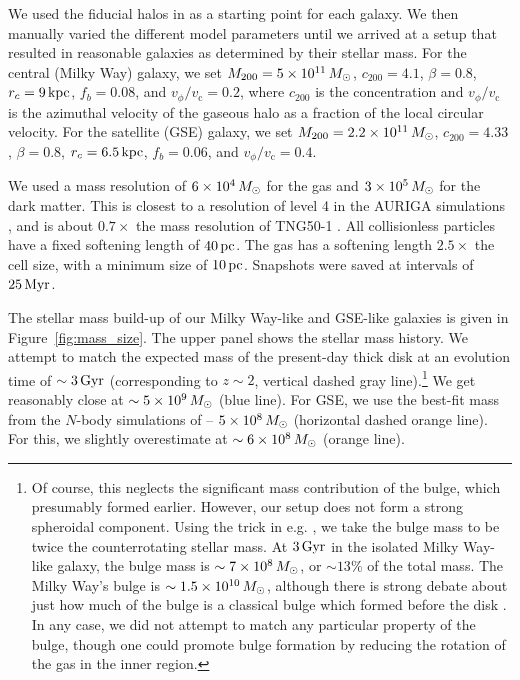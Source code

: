 We used the fiducial halos in \citet{2021ApJ...923...92N} as a starting point for each galaxy. We then manually varied the different model parameters until we arrived at a setup that resulted in reasonable galaxies as determined by their stellar mass. For the central (Milky Way) galaxy, we set $M_{200}=5\times10^{11}\,M_{\odot}$, $c_{200}=4.1$, $\beta=0.8$, $r_c=9\,\textrm{kpc}$, $f_b=0.08$, and $v_{\phi}/v_{\textrm{c}}=0.2$, where $c_{200}$ is the concentration and $v_{\phi}/v_{\textrm{c}}$ is the azimuthal velocity of the gaseous halo as a fraction of the local circular velocity. For the satellite (GSE) galaxy, we set $M_{200}=2.2\times10^{11}\,M_{\odot}$, $c_{200}=4.33$, $\beta=0.8$, $r_c=6.5\,\textrm{kpc}$, $f_b=0.06$, and $v_{\phi}/v_{\textrm{c}}=0.4$.

We used a mass resolution of $6\times10^4\,M_{\odot}$ for the gas and $3\times10^5\,M_{\odot}$ for the dark matter. This is closest to a resolution of level 4 in the AURIGA simulations \citep{2017MNRAS.467..179G}, and is about $0.7\times$ the mass resolution of TNG50-1 \citep{2019MNRAS.490.3234N,2019MNRAS.490.3196P}. All collisionless particles have a fixed softening length of $40\,\textrm{pc}$. The gas has a softening length $2.5\times$ the cell size, with a minimum size of $10\,\textrm{pc}$. Snapshots were saved at intervals of $25\,\textrm{Myr}$.

The stellar mass build-up of our Milky Way-like and GSE-like galaxies is given in Figure~\ref{fig:mass_size}. The upper panel shows the stellar mass history. We attempt to match the expected mass of the present-day thick disk \citep[$\sim6\times10^9\,\Msun$, horizontal blue dashed line][]{2016ARA&A..54..529B} at an evolution time of $\sim3\,\textrm{Gyr}$ (corresponding to $z\sim2$, vertical dashed gray line).\footnote{Of course, this neglects the significant mass contribution of the bulge, which presumably formed earlier. However, our setup does not form a strong spheroidal component. Using the trick in e.g. \citet{2022MNRAS.515.1524Z}, we take the bulge mass to be twice the counterrotating stellar mass. At $3\,\textrm{Gyr}$ in the isolated Milky Way-like galaxy, the bulge mass is $\sim7\times10^{8}\,M_{\odot}$, or $\sim13\%$ of the total mass. The Milky Way's bulge is  $\sim1.5\times10^{10}\,M_{\odot}$, although there is strong debate about just how much of the bulge is a classical bulge which formed before the disk \citep{2016ARA&A..54..529B}. In any case, we did not attempt to match any particular property of the bulge, though one could promote bulge formation by reducing the rotation of the gas in the inner region.} We get reasonably close at $\sim5\times10^9\,M_{\odot}$ (blue line). For GSE, we use the best-fit mass from the $N$-body simulations of \citet{2021ApJ...923...92N} -- $5\times10^8\,M_{\odot}$ (horizontal dashed orange line). For this, we slightly overestimate at $\sim6\times10^8\,M_{\odot}$ (orange line).

